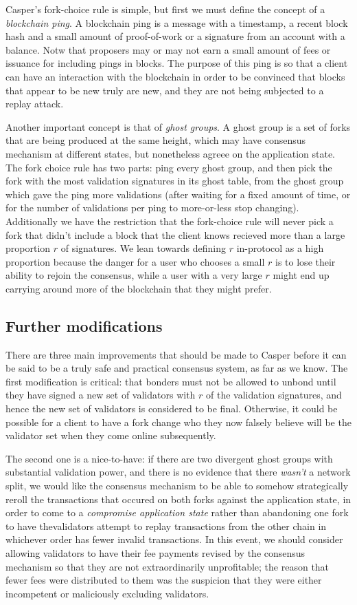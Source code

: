 \documentclass[11pt,a4paper]{article}
\begin{document}
Casper's fork-choice rule is simple, but first we must define the concept of a \emph{blockchain ping}. A blockchain ping is a message with a timestamp, a recent block hash and a small amount of proof-of-work or a signature from an account with a balance. Notw that proposers may or may not earn a small amount of fees or issuance for including pings in blocks. The purpose of this ping is so that a client can have an interaction with the blockchain in order to be convinced that blocks that appear to be new truly are new, and they are not being subjected to a replay attack.

Another important concept is that of \emph{ghost groups}. A ghost group is a set of forks that are being produced at the same height, which may have consensus mechanism at different states, but nonetheless agreee on the application state. The fork choice rule has two parts: ping every ghost group, and then pick the fork with the most validation signatures in its ghost table, from the ghost group which gave the ping more validations (after waiting for a fixed amount of time, or for the number of validations per ping to more-or-less stop changing). Additionally we have the restriction that the fork-choice rule will never pick a fork that didn't include a block that the client knows recieved more than a large proportion $r$ of signatures. We lean towards defining $r$ in-protocol as a high proportion because the danger for a user who chooses a small $r$ is to lose their ability to rejoin the consensus, while a user with a very large $r$ might end up carrying around more of the blockchain that they might prefer. 

\subsection{Further modifications}

There are three main improvements that should be made to Casper before it can be said to be a truly safe and practical consensus system, as far as we know. The first modification is critical: that bonders must not be allowed to unbond until they have signed a new set of validators with $r$ of the validation signatures, and hence the new set of validators is considered to be final. Otherwise, it could be possible for a client to have a fork change who they now falsely believe will be the validator set when they come online subsequently.

The second one is a nice-to-have: if there are two divergent ghost groups with substantial validation power, and there is no evidence that there \emph{wasn't} a network split, we would like the consensus mechanism to be able to somehow strategically reroll the transactions that occured on both forks against the application state, in order to come to a \emph{compromise application state} rather than abandoning one fork to have thevalidators attempt to replay transactions from the other chain in whichever order has fewer invalid transactions. In this event, we should consider allowing validators to have their fee payments revised by the consensus mechanism so that they are not extraordinarily unprofitable; the reason that fewer fees were distributed to them was the suspicion that they were either incompetent or maliciously excluding validators. 
\end{document}
